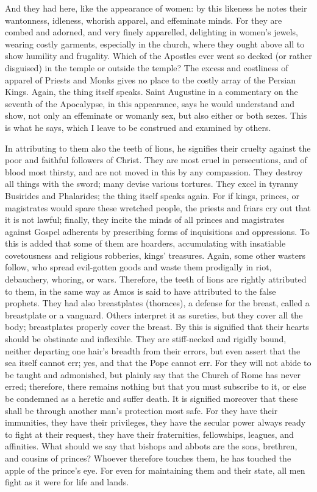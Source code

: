 And they had here, like the appearance of women: by this likeness he notes their wantonness, idleness, whorish apparel, and effeminate minds. For they are combed and adorned, and very finely apparelled, delighting in women’s jewels, wearing costly garments, especially in the church, where they ought above all to show humility and frugality. Which of the Apostles ever went so decked (or rather disguised) in the temple or outside the temple? The excess and costliness of apparel of Priests and Monks gives no place to the costly array of the Persian Kings. Again, the thing itself speaks. Saint Augustine in a commentary on the seventh of the Apocalypse, in this appearance, says he would understand and show, not only an effeminate or womanly sex, but also either or both sexes. This is what he says, which I leave to be construed and examined by others.

In attributing to them also the teeth of lions, he signifies their cruelty against the poor and faithful followers of Christ. They are most cruel in persecutions, and of blood most thirsty, and are not moved in this by any compassion. They destroy all things with the sword; many devise various tortures. They excel in tyranny Busirides and Phalarides; the thing itself speaks again. For if kings, princes, or magistrates would spare these wretched people, the priests and friars cry out that it is not lawful; finally, they incite the minds of all princes and magistrates against Gospel adherents by prescribing forms of inquisitions and oppressions. To this is added that some of them are hoarders, accumulating with insatiable covetousness and religious robberies, kings’ treasures. Again, some other wasters follow, who spread evil-gotten goods and waste them prodigally in riot, debauchery, whoring, or wars. Therefore, the teeth of lions are rightly attributed to them, in the same way as Amos is said to have attributed to the false prophets. They had also breastplates (thoraces), a defense for the breast, called a breastplate or a vanguard. Others interpret it as sureties, but they cover all the body; breastplates properly cover the breast. By this is signified that their hearts should be obstinate and inflexible. They are stiff-necked and rigidly bound, neither departing one hair’s breadth from their errors, but even assert that the sea itself cannot err; yes, and that the Pope cannot err. For they will not abide to be taught and admonished, but plainly say that the Church of Rome has never erred; therefore, there remains nothing but that you must subscribe to it, or else be condemned as a heretic and suffer death. It is signified moreover that these shall be through another man’s protection most safe. For they have their immunities, they have their privileges, they have the secular power always ready to fight at their request, they have their fraternities, fellowships, leagues, and affinities. What should we say that bishops and abbots are the sons, brethren, and cousins of princes? Whoever therefore touches them, he has touched the apple of the prince’s eye. For even for maintaining them and their state, all men fight as it were for life and lands.

